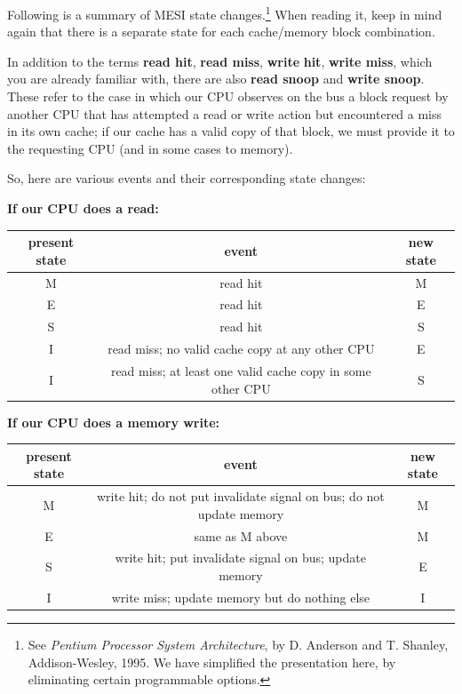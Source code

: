 \par{} \vspace{0.3cm}

Following is a summary of MESI state changes.\footnote{See \emph{Pentium
Processor System Architecture}, by D. Anderson and T.  Shanley,
Addison-Wesley, 1995. We have simplified the presentation here, by
eliminating certain programmable options.} When reading it, keep in mind
again that there is a separate state for each cache/memory block combination.

In addition to the terms \textbf{read hit}, \textbf{read miss},
\textbf{write} \textbf{hit}, \textbf{write miss}, which you are already
familiar with, there are also \textbf{read snoop} and \textbf{write
snoop}.  These refer to the case in which our CPU observes on the bus a
block request by another CPU that has attempted a read or write action
but encountered a miss in its own cache; if our cache has a valid copy
of that block, we must provide it to the requesting CPU (and in some
cases to memory).

So, here are various events and their corresponding state changes:

{\bf If our CPU does a read:}

\begin{tabular}{|c|c|c|}
\hline
present state&
 event&
 new state\\
\hline
M&
 read hit&
 M\\
\hline
E&
 read hit&
 E\\
\hline
S&
 read hit&
 S\\
\hline
I&
 read miss; no valid cache copy at any other CPU &
 E\\
\hline
I&
 read miss; at least one valid cache copy in some other CPU &
 S  \\
\hline
\end{tabular}

\par{} \vspace{0.3cm}

{\bf If our CPU does a memory write:}

\begin{tabular}{|c|c|c|}
\hline
present state&
 event&
 new state\\
\hline
M&
 write hit; do not put invalidate signal on bus; do not update memory&
 M\\
\hline
E&
 same as M above&
 M\\
\hline
S&
 write hit; put invalidate signal on bus; update memory&
 E\\
\hline
I&
 write miss; update memory but do nothing else&
 I  \\
\hline
\end{tabular}

